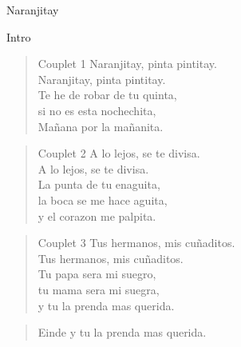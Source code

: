 \begin{song}[huayno]{Naranjitay}

\begin{instrumental}{Intro}
\measure{}\measure{}\measure{}\measure{}\measure{}\measure{}
\measure{}\measure{}
\end{instrumental}


\begin{verse}{Couplet 1}
Naranjitay, pinta pintitay.\\
Naranjitay, pinta pintitay.\\
Te he de robar de tu quinta,\\
si no es esta nochechita,\\
Mañana por la mañanita.\phantom{xxxx}
\end{verse}


\begin{verse}{Couplet 2}
A lo lejos, se te divisa.\\
A lo lejos, se te divisa.\\
La punta de tu enaguita,\\
la boca se me hace aguita,\\
y el corazon me palpita.\phantom{xxxx}
\end{verse}


\begin{verse}{Couplet 3}
Tus hermanos, mis cuñaditos. \\
Tus hermanos, mis cuñaditos. \\
Tu papa sera mi suegro,\\
tu mama sera mi suegra,\\
y tu la prenda mas querida.
\end{verse}

\begin{verse}{Einde}
y tu la prenda mas querida. \hspace{3em} 
\end{verse}
\end{song} 

